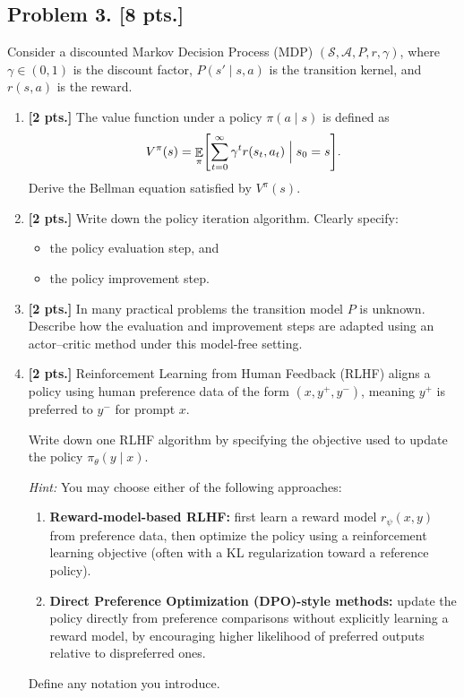 \documentclass[11pt,a4paper]{article}
\DeclareMathOperator{\E}{\mathbb{E}}
\begin{document}
\subsection{Problem 3. [8 pts.]}
Consider a discounted Markov Decision Process (MDP) $(\mathcal{S}, \mathcal{A}, P, r, \gamma)$, where $\gamma \in (0, 1)$ is the discount factor, $P(s' \mid s, a)$ is the transition kernel, and $r(s, a)$ is the reward.
\begin{enumerate}[label=(\alph*)]
    \item \textbf{[2 pts.]} The value function under a policy $\pi(a \mid s)$ is defined as
    \[
    V^{\pi}(s) = \E_{\pi} \Biggl[ \sum_{t=0}^{\infty} \gamma^{t} r(s_t, a_t) \Bigm| s_0 = s \Biggr].
    \]
    Derive the Bellman equation satisfied by $V^{\pi}(s)$.
    \item \textbf{[2 pts.]} Write down the policy iteration algorithm. Clearly specify:
    \begin{itemize}
        \item the policy evaluation step, and
        \item the policy improvement step.
    \end{itemize}
    \item \textbf{[2 pts.]} In many practical problems the transition model $P$ is unknown. Describe how the evaluation and improvement steps are adapted using an actor--critic method under this model-free setting.
    \item \textbf{[2 pts.]} Reinforcement Learning from Human Feedback (RLHF) aligns a policy using human preference data of the form $(x, y^{+}, y^{-})$, meaning $y^{+}$ is preferred to $y^{-}$ for prompt $x$.

    Write down one RLHF algorithm by specifying the objective used to update the policy $\pi_{\theta}(y \mid x)$.

    \textit{Hint:} You may choose either of the following approaches:
    \begin{enumerate}[label=(\alph*)]
        \item \textbf{Reward-model-based RLHF:} first learn a reward model $r_{\psi}(x, y)$ from preference data, then optimize the policy using a reinforcement learning objective (often with a KL regularization toward a reference policy).
        \item \textbf{Direct Preference Optimization (DPO)-style methods:} update the policy directly from preference comparisons without explicitly learning a reward model, by encouraging higher likelihood of preferred outputs relative to dispreferred ones.
    \end{enumerate}
    Define any notation you introduce.
\end{enumerate}
\end{document}
